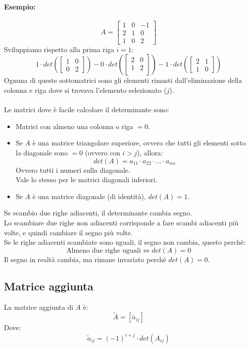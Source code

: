 \documentclass[12pt,a4paper]{article}
\begin{document}
\paragraph{Esempio:}
\[
A = \begin{bmatrix}
  1 & 0 & -1\\
  2 & 1 & 0\\
  1 & 0 & 2
\end{bmatrix}
\]
Sviluppiamo rispetto alla prima riga $i = 1$:
\[
1 \cdot det(\begin{bmatrix}
  1 & 0\\
  0 & 2
\end{bmatrix}) - 0 \cdot det(\begin{bmatrix}
  2 & 0\\
  1 & 2\\
\end{bmatrix}) - 1 \cdot det(\begin{bmatrix}
  2 & 1\\
  1 & 0
\end{bmatrix})
\]
Ognuna di queste sottomatrici sono gli elementi rimasti dall'eliminazione della colonna e riga dove si trovava l'elemento selezionato ($j$).\\\\
Le matrici dove è facile calcolare il determinante sono:
\begin{itemize}
  \item Matrici con almeno una colonna o riga $= 0$.
  \item Se $A$ è una matrice triangolare superiore, ovvero che tutti gli elementi sotto la diagonale sono $= 0$ (ovvero con $i > j$), allora:
  \[
  det(A) = a_{11} \cdot a_{22} \cdot \ldots \cdot a_{nn}
  \]
  Ovvero tutti i numeri sulla diagonale.\\
  Vale lo stesso per le matrici diagonali inferiori.
  \item Se $A$ è una matrice diagonale (di identità), $det(A) = 1$.
\end{itemize}
Se scambio due righe adiacenti, il determinante cambia segno.\\
Lo scambiare due righe non adiacenti corrisponde a fare scambi adiacenti più volte, e quindi cambiare il segno più volte.\\
Se le righe adiacenti scambiate sono uguali, il segno non cambia, questo perchè:
\[
\text{Almeno due righe uguali} \Leftrightarrow det(A) = 0
\]
Il segno in realtà cambia, ma rimane invariato perchè $det(A) = 0$.
\subsection{Matrice aggiunta}
La matrice aggiunta di $A$ è:
\[
\tilde{A} = [\tilde{a}_{ij}]
\]
Dove:
\[
\tilde{a}_{ij} = (-1)^{i+j} \cdot det(A_{ij})
\]
\end{document}
